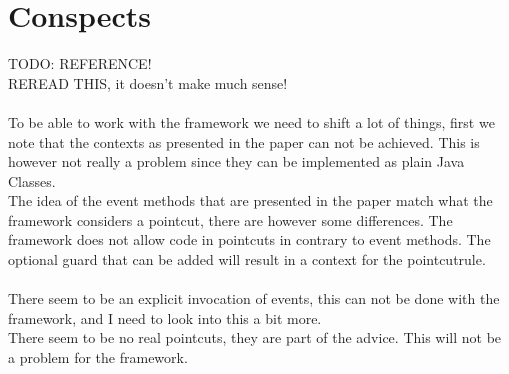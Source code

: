 \documentclass[a4paper]{report}
\begin{document}
\section{Conspects}
TODO: REFERENCE!\\
REREAD THIS, it doesn't make much sense!\\
\\
To be able to work with the framework we need to shift a lot of things, first we note that the contexts as presented in the paper can not be achieved. This is however not really a problem since they can be implemented as plain Java Classes.\\
The idea of the event methods that are presented in the paper match what the framework considers a pointcut, there are however some differences. The framework does not allow code in pointcuts in contrary to event methods. The optional guard that can be added will result in a context for the pointcutrule.\\
\\
There seem to be an explicit invocation of events, this can not be done with the framework, and I need to look into this a bit more.\\
There seem to be no real pointcuts, they are part of the advice. This will not be a problem for the framework.
\end{document}

